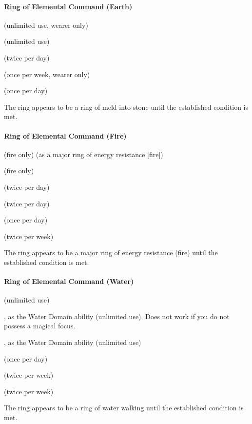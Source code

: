 \paragraph{Ring of Elemental Command (Earth)}
\begin{list}{}{\leftmargin=1em}
\item {} (unlimited use, wearer only)
\item {} (unlimited use)
\item {} (twice per day)
\item {} (once per week, wearer only)
\item {} (once per day)
\end{list}
The ring appears to be a ring of meld into stone until the established condition is met.

\paragraph{Ring of Elemental Command (Fire)}
\begin{list}{}{\leftmargin=1em}
\item {} (fire only) (as a major ring of energy resistance [fire])
\item {} (fire only)
\item {} (twice per day)
\item {} (twice per day)
\item {}  (once per day)
\item {} (twice per week)
\end{list}
The ring appears to be a major ring of energy resistance (fire) until the established condition is met.

\paragraph{Ring of Elemental Command (Water)}
\begin{list}{}{\leftmargin=1em}
\item {} (unlimited use)
\item {}, as the Water Domain ability (unlimited use). Does not work if you do not possess a magical focus.
\item {}, as the Water Domain ability (unlimited use)
\item {} (once per day)
\item {} (twice per week)
\item {} (twice per week)
\end{list}
The ring appears to be a ring of water walking until the established condition is met.

